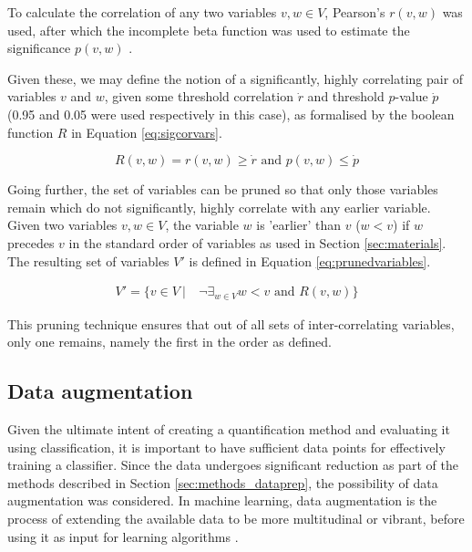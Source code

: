 \documentclass[conference,a4paper,twoside]{IEEEtran}
\newcommand\given[1][]{\:#1\vert\:}
\begin{document}
To calculate the correlation of any two variables $v,w \in V$, Pearson's $r(v,w)$ was used, after which the incomplete beta function was used to estimate the significance $p(v,w)$ \cite{scipypearson}.

Given these, we may define the notion of a significantly, highly correlating pair of variables $v$ and $w$, given some threshold correlation $\dot{r}$ and threshold $p$-value $\dot{p}$ (0.95 and 0.05 were used respectively in this case), as formalised by the boolean function $R$ in Equation \ref{eq:sigcorvars}.

\begin{equation}\label{eq:sigcorvars}
    R(v,w) = r(v,w) \geq \dot{r} \text{ and } p(v,w) \leq \dot{p}
\end{equation}

Going further, the set of variables can be pruned so that only those variables remain which do not significantly, highly correlate with any earlier variable. Given two variables $v,w \in V$, the variable $w$ is 'earlier' than $v$ ($w<v$) if $w$ precedes $v$ in the standard order of variables as used in Section \ref{sec:materials}. The resulting set of variables $V'$ is defined in Equation \ref{eq:prunedvariables}.

\begin{equation}\label{eq:prunedvariables}
    \begin{split}
        V' = \{ v \in V \given & \neg \exists_{w \in V} w < v \text{ and } R(v,w) \}
    \end{split}
\end{equation}

This pruning technique ensures that out of all sets of inter-correlating variables, only one remains, namely the first in the order as defined.

\subsection{Data augmentation}
\label{sec:methods_augment}

Given the ultimate intent of creating a quantification method and evaluating it using classification, it is important to have sufficient data points for effectively training a classifier. Since the data undergoes significant reduction as part of the methods described in Section \ref{sec:methods_dataprep}, the possibility of data augmentation was considered. In machine learning, data augmentation is the process of extending the available data to be more multitudinal or vibrant, before using it as input for learning algorithms \cite{fawzi2016adaptive}.
\end{document}
